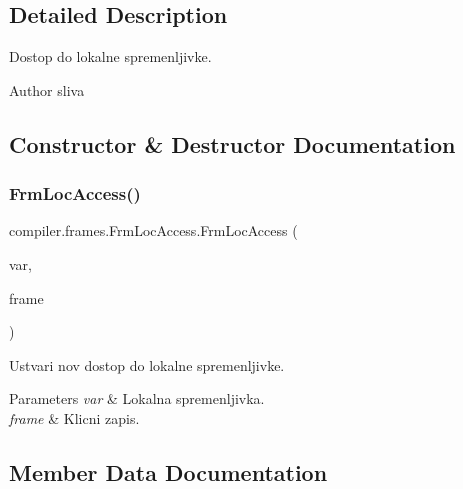 \subsection{Detailed Description}
Dostop do lokalne spremenljivke.

\begin{DoxyAuthor}{Author}
sliva 
\end{DoxyAuthor}


\subsection{Constructor \& Destructor Documentation}
\mbox{\label{classcompiler_1_1frames_1_1_frm_loc_access_a74782b8f68a073bd99b83db745f457da}} 
\subsubsection{\texorpdfstring{Frm\+Loc\+Access()}{FrmLocAccess()}}
{\footnotesize\ttfamily compiler.\+frames.\+Frm\+Loc\+Access.\+Frm\+Loc\+Access (\begin{DoxyParamCaption}\item[{\hyperlink{classcompiler_1_1abstr_1_1tree_1_1def_1_1_abs_var_def}{Abs\+Var\+Def}}]{var,  }\item[{\hyperlink{classcompiler_1_1frames_1_1_frm_frame}{Frm\+Frame}}]{frame }\end{DoxyParamCaption})}

Ustvari nov dostop do lokalne spremenljivke.


\begin{DoxyParams}{Parameters}
{\em var} & Lokalna spremenljivka. \\
\hline
{\em frame} & Klicni zapis. \\
\hline
\end{DoxyParams}


\subsection{Member Data Documentation}
\mbox{\label{classcompiler_1_1frames_1_1_frm_loc_access_abbd8912a1647b160319e9142426b4acf}} 
